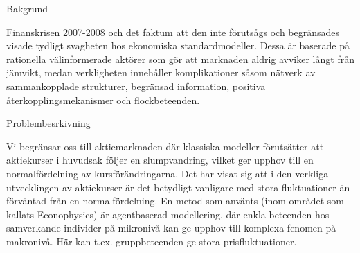 Bakgrund

Finanskrisen 2007-2008 och det faktum att den inte förutsågs och begränsades visade tydligt svagheten hos ekonomiska standardmodeller. Dessa är baserade på rationella välinformerade aktörer som gör att marknaden aldrig avviker långt från jämvikt, medan verkligheten innehåller komplikationer såsom nätverk av sammankopplade strukturer, begränsad information, positiva återkopplingsmekanismer och flockbeteenden.


Problembesrkivning

Vi begränsar oss till aktiemarknaden där klassiska modeller förutsätter att aktiekurser i huvudsak följer en slumpvandring, vilket ger upphov till en normalfördelning av kursförändringarna. Det har visat sig att i den verkliga utvecklingen av aktiekurser är det betydligt vanligare med stora fluktuationer än förväntad från en normalfördelning. En metod som använts (inom området som kallats Econophysics) är agentbaserad modellering, där enkla beteenden hos samverkande individer på mikronivå kan ge upphov till komplexa fenomen på makronivå. Här kan t.ex. gruppbeteenden ge stora prisfluktuationer.